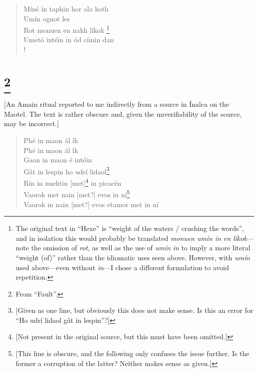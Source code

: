 \documentclass{article}
\let\oldthefootnote\thefootnote
\newcommand\oocfootnote[2][DarkGreen]{\renewcommand\thefootnote{\color{#1}\oldthefootnote}%
  \footnote{\color{#1}#2}%
  \renewcommand{\thefootnote}{\oldthefootnote}}
\begin{document}
\begin{verse}
Míné in taphin hor ala koth \\
Umín ognot les \\
Rot monuen en nakh líkok\oocfootnote{The original text in ``Hexe'' is ``weight of the waters / crushing the words'', and in isolation this would probably be translated \emph{monuen umín in en líkok}—note the omission of \emph{rot}, as well as the use of \emph{umín in} to imply a more literal ``weight (of)'' rather than the idiomatic uses seen above. However, with \emph{umín} used above—even without \emph{in}—I chose a different formulation to avoid repetition.} \\
Umetó intéin in ód címin dan \\!

\end{verse}

\section{\oocfootnote{From ``Fault''.}}

[An Amain ritual reported to me indirectly from a source in Ínalca on the Maotel. The text is rather obscure and, given the unverifiability of the source, may be incorrect.]


\begin{verse}
Phé in maon ál îk \\
Phé in maon ál îk \\
Gaon in maon é intéin \\
Gât in lespin ho udrí lidaol\footnote{[Given as one line, but obviously this does not make sense. Is this an error for ``Ho udrí lidaol gât in lespin''?]} \\
Rín in nuektin [met]\footnote{[Not present in the original source, but this must have been omitted.]} in picacén \\
Vaorok met nain [met?] evos in ní\footnote{[This line is obscure, and the following only confuses the issue further. Is the former a corruption of the latter? Neither makes sense as given.]} \\
Vaorok in nain [met?] evos etamor met in ní \\

\end{verse}
\end{document}
